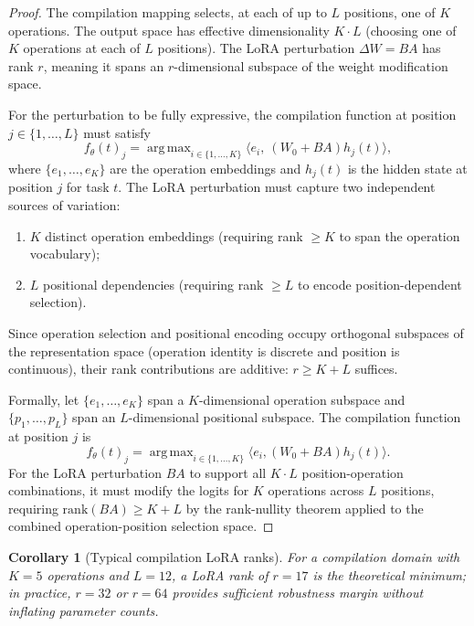 \documentclass[twocolumn,11pt,a4paper]{article}
\newtheorem{corollary}[theorem]{Corollary}
\DeclareMathOperator*{\argmax}{arg\,max}
\begin{document}
\begin{proof}
The compilation mapping selects, at each of up to $L$ positions, one of $K$ operations. The output space has effective dimensionality $K \cdot L$ (choosing one of $K$ operations at each of $L$ positions). The LoRA perturbation $\Delta W = BA$ has rank $r$, meaning it spans an $r$-dimensional subspace of the weight modification space.

For the perturbation to be fully expressive, the compilation function at position $j \in \{1, \ldots, L\}$ must satisfy
\begin{equation}
f_\theta(t)_j = \argmax_{i \in \{1, \ldots, K\}} \langle e_i,\ (W_0 + BA) h_j(t) \rangle,
\end{equation}
where $\{e_1, \ldots, e_K\}$ are the operation embeddings and $h_j(t)$ is the hidden state at position $j$ for task $t$. The LoRA perturbation must capture two independent sources of variation:
\begin{enumerate}[leftmargin=*,itemsep=1pt]
\item $K$ distinct operation embeddings (requiring rank $\geq K$ to span the operation vocabulary);
\item $L$ positional dependencies (requiring rank $\geq L$ to encode position-dependent selection).
\end{enumerate}
Since operation selection and positional encoding occupy orthogonal subspaces of the representation space (operation identity is discrete and position is continuous), their rank contributions are additive: $r \geq K + L$ suffices.

Formally, let $\{e_1, \ldots, e_K\}$ span a $K$-dimensional operation subspace and $\{p_1, \ldots, p_L\}$ span an $L$-dimensional positional subspace. The compilation function at position $j$ is
\begin{equation}
f_\theta(t)_j = \argmax_{i \in \{1, \ldots, K\}} \langle e_i, (W_0 + BA) h_j(t) \rangle.
\end{equation}
For the LoRA perturbation $BA$ to support all $K \cdot L$ position-operation combinations, it must modify the logits for $K$ operations across $L$ positions, requiring $\mathrm{rank}(BA) \geq K + L$ by the rank-nullity theorem applied to the combined operation-position selection space.
\end{proof}

\begin{corollary}[Typical compilation LoRA ranks]
\label{cor:typical-ranks}
For a compilation domain with $K = 5$ operations and $L = 12$, a LoRA rank of $r = 17$ is the theoretical minimum; in practice, $r = 32$ or $r = 64$ provides sufficient robustness margin without inflating parameter counts.
\end{corollary}
\end{document}

